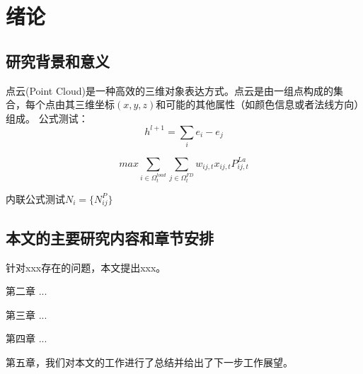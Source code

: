 \chapter{绪论}
\label{chap:introduction}

\section{研究背景和意义}
点云(Point Cloud)是一种高效的三维对象表达方式。点云是由一组点构成的集合，每个点由其三维坐标$(x,y,z)$和可能的其他属性（如颜色信息或者法线方向）组成。
公式测试：
\begin{equation}
	h^{l+1} = \sum_i {e_i - e_j}
\end{equation}

\begin{equation}
	max\sum_{i \in \Omega_t^{load} }\sum_{j \in \Omega_t^{FD} }w_{ij,t}x_{ij,t}P_{ij,t}^{La}
\end{equation}

内联公式测试$N_i = \{  N_{ij}^{P}\}$

\subsection{}

\section{本文的主要研究内容和章节安排}

针对xxx存在的问题，本文提出xxx。

第二章 ...

第三章 ...

第四章 ...

第五章，我们对本文的工作进行了总结并给出了下一步工作展望。





